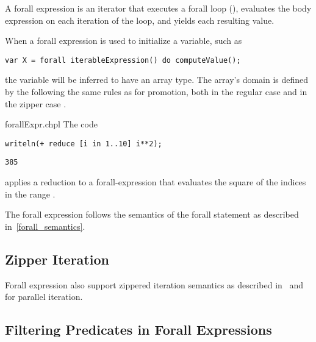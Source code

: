 A forall expression is an iterator that executes a forall loop (),
evaluates the body expression on each iteration of the loop,
and yields each resulting value.

When a forall expression is used to initialize a variable, such as
\begin{chapel}
\begin{verbatim}
var X = forall iterableExpression() do computeValue();
\end{verbatim}
\end{chapel}
the variable will be inferred to have an array type.
The array's domain is defined by the 
following the same rules as for promotion, both in the regular
case  and in the zipper case .

\begin{chapelexample}{forallExpr.chpl}
The code
\begin{chapel}
\begin{verbatim}
writeln(+ reduce [i in 1..10] i**2);
\end{verbatim}
\end{chapel}
\begin{chapeloutput}
\begin{verbatim}
385
\end{verbatim}
\end{chapeloutput}
applies a reduction to a forall-expression that evaluates the square
of the indices in the range .
\end{chapelexample}

The forall expression follows the semantics of the forall statement as
described in~\ref{forall_semantics}.

\subsection{Zipper Iteration}
Forall expression also support zippered iteration semantics as
described in~ and~ for
parallel iteration.

\subsection{Filtering Predicates in Forall Expressions}
\label{Filtering_Predicates_Forall}

